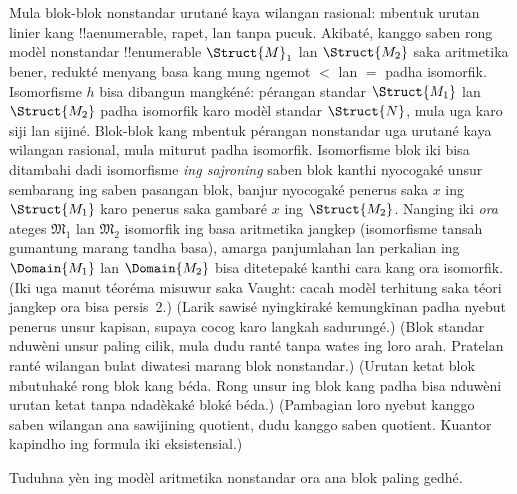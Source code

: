 \documentclass[../../../include/open-logic-section]{subfiles}
\begin{document}
Mula blok-blok nonstandar urutané kaya wilangan rasional:
mbentuk urutan linier kang !!a{enumerable}, rapet,
lan tanpa pucuk. Akibaté, kanggo saben rong modèl
nonstandar !!{enumerable} $\Struct{M}_1$ lan
$\Struct{M_2}$ saka aritmetika bener,
redukté menyang basa kang mung ngemot $<$ lan $=$
padha isomorfik. Isomorfisme $h$ bisa dibangun mangkéné:
pérangan standar $\Struct{M_1}$ lan $\Struct{M_2}$
padha isomorfik karo modèl standar $\Struct{N}$,
mula uga karo siji lan sijiné. Blok-blok kang mbentuk
pérangan nonstandar uga urutané kaya wilangan rasional,
mula miturut  padha isomorfik.
Isomorfisme blok iki bisa ditambahi dadi isomorfisme
\emph{ing sajroning} saben blok kanthi nyocogaké
unsur sembarang ing saben pasangan blok, banjur
nyocogaké penerus saka $x$ ing $\Struct{M_1}$
karo penerus saka gambaré $x$ ing $\Struct{M_2}$.
Nanging iki \emph{ora} ateges $\mathfrak{M}_1$
lan $\mathfrak{M}_2$ isomorfik ing basa aritmetika
jangkep (isomorfisme tansah gumantung marang tandha
basa), amarga panjumlahan lan perkalian ing
$\Domain{M_1}$ lan $\Domain{M_2}$ bisa ditetepaké
kanthi cara kang ora isomorfik. (Iki uga manut téoréma
misuwur saka Vaught: cacah modèl terhitung saka
téori jangkep ora bisa persis~2.)
(Larik sawisé nyingkiraké kemungkinan padha nyebut penerus unsur kapisan, supaya cocog karo langkah sadurungé.)
(Blok standar nduwèni unsur paling cilik, mula dudu ranté tanpa wates ing loro arah. Pratelan ranté wilangan bulat diwatesi marang blok nonstandar.)
(Urutan ketat blok mbutuhaké rong blok kang béda. Rong unsur ing blok kang padha bisa nduwèni urutan ketat tanpa ndadèkaké bloké béda.)
(Pambagian loro nyebut kanggo saben wilangan ana sawijining quotient, dudu kanggo saben quotient. Kuantor kapindho ing formula iki eksistensial.)

\begin{prob}
Tuduhna yèn ing modèl aritmetika nonstandar ora ana
blok paling gedhé.
\end{prob}
\end{document}
